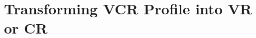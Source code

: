 
\chapter{Transforming VCR Profile into VR or CR} 

\ifpdf
    \graphicspath{{Chapter7/Figs/Raster/}{Chapter7/Figs/PDF/}{Chapter7/Figs/}}
\else
    \graphicspath{{Chapter7/Figs/Vector/}{Chapter7/Figs/}}
\fi

